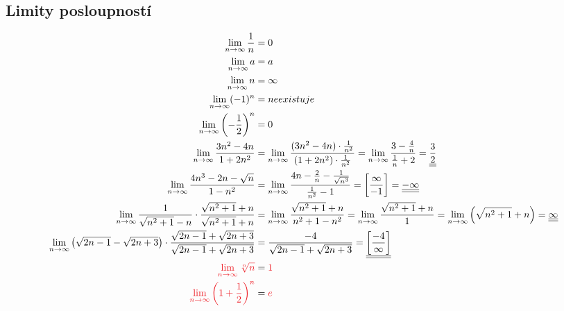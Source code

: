     \subsection*{Limity posloupností}
    \begin{align*}
        \limit{\frac{1}{n}} &= 0
        \\ \limit{a} &= a
        \\ \limit{n} &= \infty
        \\ \limit{(-1)^n} &= neexistuje
        \\ \limit{\left(-\frac{1}{2}\right)^n} &= 0 
        \\ \limit{\frac{3n^2-4n}{1+2n^2}} &= \limit{\frac{(3n^2-4n)\cdot{\frac{1}{n^2}}}{(1+2n^2)\cdot{\frac{1}{n^2}}}} = \limit{\frac{3-\frac{4}{n}}{\frac{1}{n}+2}} =  \doubleunderline{\frac{3}{2}} \\
        \limit{\frac{4n^3-2n-\sqrt{n}}{1-n^2}} &= \limit{\frac{4n-\frac{2}{n}-\frac{1}{\sqrt{n^3}}}{\frac{1}{n^2}-1}} = \left[\frac{\infty}{-1}\right] = \doubleunderline{-\infty} \\
        \limit{\frac{1}{\sqrt{n^2+1}-n}} \cdot \frac{\sqrt{n^2+1}+n}{\sqrt{n^2+1}+n} &= \limit{\frac{\sqrt{n^2+1}+n}{n^2+1-n^2}} = \limit{\frac{\sqrt{n^2+1}+n}{1}} = \limit{\left(\sqrt{n^2+1}+n\right)} = \doubleunderline{\infty} \\
        \limit{\left(\sqrt{2n-1}-\sqrt{2n+3}\right)} \cdot \frac{\sqrt{2n-1}+\sqrt{2n+3}}{\sqrt{2n-1}+\sqrt{2n+3}} &= \frac{-4}{\sqrt{2n-1}+\sqrt{2n+3}} = \doubleunderline{\left[\frac{-4}{\infty}\right]} \\
        \red{\limit{\sqrt[n]{n}}} &= \red{1}  \\
        \red{\limit{\left(1+\frac{1}{2}\right)^n}} &= \red{e} 
    \end{align*}
